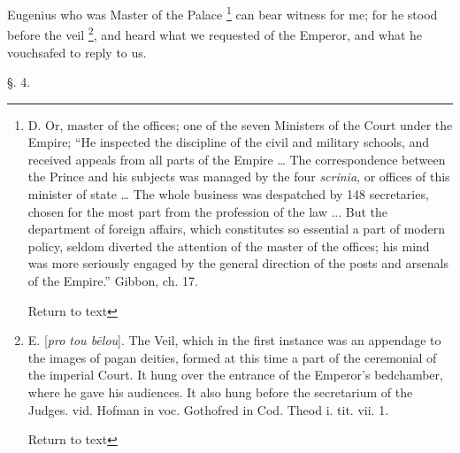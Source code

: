 Eugenius who was Master of the Palace \footnote{D. Or, master of the offices; one of the seven Ministers of the Court
under the Empire; ``He inspected the discipline of the civil and
military schools, and received appeals from all parts of the Empire
… The correspondence between the Prince and his subjects was managed
by the four \emph{scrinia},
or offices of this minister of state … The whole business was
despatched by 148 secretaries, chosen for the most part from the
profession of the law ... But the department of foreign affairs, which
constitutes so essential a part of modern policy, seldom diverted the
attention of the master of the offices; his mind was more seriously
engaged by the general direction of the posts and arsenals of the
Empire.'' Gibbon, ch. 17.

Return to text} can bear witness for me; for he stood before the veil \footnote{E. [\emph{pro
tou b\={e}lou}].
The Veil, which in the first instance was an appendage to the images
of pagan deities, formed at this time a part of the ceremonial of the
imperial Court. It hung over the entrance of the Emperor's bedchamber,
where he gave his audiences. It also hung before the secretarium of
the Judges. vid. Hofman in voc. Gothofred in Cod. Theod i. tit. vii.
1.

Return to text}, and heard what we requested of the Emperor, and what he
vouchsafed to reply to us.

§. 4.

